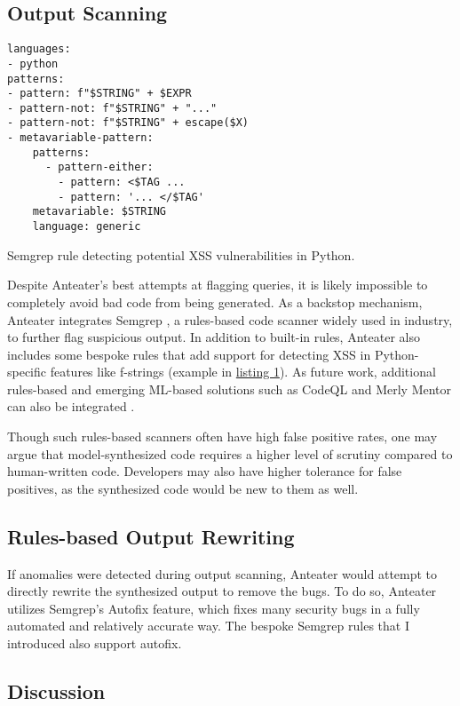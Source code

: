 \documentclass[sigplan,screen,nonacm]{acmart}
\begin{document}
\subsection{Output Scanning}

\begin{listing}
\begin{verbatim}
languages:
- python
patterns:
- pattern: f"$STRING" + $EXPR
- pattern-not: f"$STRING" + "..."
- pattern-not: f"$STRING" + escape($X)
- metavariable-pattern:
    patterns:
      - pattern-either:
        - pattern: <$TAG ...
        - pattern: '... </$TAG'
    metavariable: $STRING
    language: generic
\end{verbatim}
\caption{Semgrep rule detecting potential XSS vulnerabilities in Python.}
\label{lst:semgrep}
\end{listing}

Despite Anteater's best attempts at flagging queries, it is likely impossible to completely avoid bad code from being generated. As a backstop mechanism, Anteater integrates Semgrep \cite{semgrep}, a rules-based code scanner widely used in industry, to further flag suspicious output. In addition to built-in rules, Anteater also includes some bespoke rules that add support for detecting XSS in Python-specific features like f-strings (example in \hyperref[lst:semgrep]{listing 1}). As future work, additional rules-based and emerging ML-based solutions such as CodeQL and Merly Mentor can also be integrated \cite{codeql, merly-mentor}.

Though such rules-based scanners often have high false positive rates, one may argue that model-synthesized code requires a higher level of scrutiny compared to human-written code. Developers may also have higher tolerance for false positives, as the synthesized code would be new to them as well.

\subsection{Rules-based Output Rewriting}

If anomalies were detected during output scanning, Anteater would attempt to directly rewrite the synthesized output to remove the bugs. To do so, Anteater utilizes Semgrep's Autofix feature, which fixes many security bugs in a fully automated and relatively accurate way. The bespoke Semgrep rules that I introduced also support autofix.

\subsection{Discussion}
\end{document}
